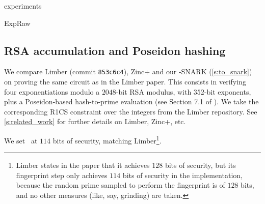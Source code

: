 \begin{lncsappendix}{experiments}
\begin{lncsmove}{ExpRaw}
\begin{table}[H]
  \caption{ Cost of \ftwoz\ (\cref{c:core_iop}) for committing to $\codedim = 2^{n}$ bits, $n = 20, \ldots, 31$, and proving one claim $\langle \vv, \bff\rangle = \mu$ over $\FF_q$. Configured for $100$ bits of round-by-round knowledge soundness. The \emph{grand product} column comprises Phase 3 of \cref{c:core_iop}. The \emph{ring switch} and \emph{Ligerito} columns comprise Phase 4. The \emph{Non-Ligerito} proof size is comprised of the $\mu_j$ values in Round 2 of \cref{c:core_iop}, the GKR and sumcheck messages, and the ring-switch messages. The ring switch step includes an initial sumcheck that transforms inner product claims to MLE evaluation claims. ``Lig.'' stands for Ligerito, ``Mem.'' stands for peak memory, and ``Ring s.'' for ring switch.  Measured on a MacBook Air M5, 24\,GB, CPU only.}
  \label{tab:f2z-raw-performance}
\end{table}


 




\end{lncsmove}
\subsection{RSA accumulation and Poseidon hashing}\label{s:multiswap}

We compare Limber \cite{limber} (commit \texttt{853c6c4}), Zinc+ \cite{zincplus} and our \ftwoz-SNARK (\cref{s:to_snark}) on proving the same circuit as in the Limber paper. This consists in verifying four  exponentiations modulo a $2048$-bit RSA modulus, with $352$-bit exponents, plus a Poseidon-based hash-to-prime evaluation  (see Section 7.1 of \cite{limber}). We take the corresponding R1CS constraint over the integers  from the Limber repository. See \cref{s:related_work} for further details on Limber, Zinc+, etc. 

We set \ftwoz \ at $114$ bits of security, matching Limber\footnote{Limber states in the paper that it achieves $128$ bits of security, but its fingerprint step only achieves $114$ bits of security in the implementation, because the random prime sampled to perform the fingerprint is of $128$ bits, and no other measures (like, say, grinding) are taken.}. %


\end{lncsappendix}
